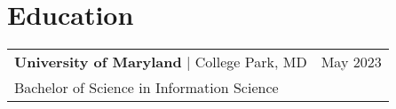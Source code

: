 \documentclass[a4paper,10pt]{article}
\newcommand{\tag}[1]{%
  \tikz[baseline]\node[anchor=base,draw=body!30,rounded corners,inner xsep=1ex,inner ysep =0.75ex,text height=1.5ex,text depth=.25ex]{#1};
}
\begin{document}
\section{Education}
\begin{tabularx}{\linewidth}{@{}l X@{}}	
\textbf{University of Maryland} | College Park, MD &  \hfill \normalsize May 2023 \\
Bachelor of Science in Information Science & \hfill \\ 
\end{tabularx}








\end{document}
